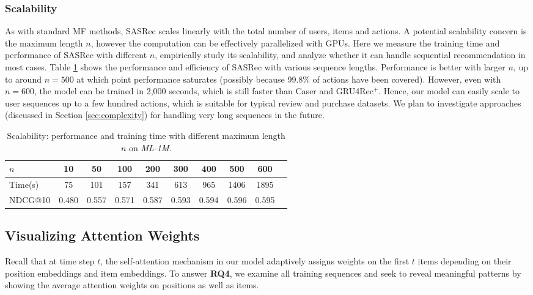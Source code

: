 \documentclass[conference]{IEEEtran}
\newcommand{\xhdr}[1]{\subsubsection*{\bf #1}}
\begin{document}
\xhdr{Scalability} As with standard MF methods, SASRec scales linearly with the total number of users, items and actions. A potential scalability concern is 
the maximum length $n$, however
the computation can be effectively parallelized
with GPUs. 
Here
we measure the training time and performance of SASRec with different $n$, empirically study its scalability, and analyze whether it can 
handle sequential recommendation in most cases. Table \ref{tab:scale} shows the performance and efficiency of SASRec with various sequence lengths. 
Performance is
better with larger $n$,
up to around $n=500$ at which point
performance saturates (possibly because 99.8\% of actions have been covered). However, even with $n=600$, the model can be trained in 2,000 seconds, which is still faster than Caser and GRU4Rec$^{\text{+}}$. Hence, our model can easily scale to user sequences 
up to a few hundred actions, which is suitable for typical review and purchase datasets.
We plan to investigate approaches (discussed in Section \ref{sec:complexity}) for handling very long sequences
in the future.



\begin{table}[h]
\centering
\caption{Scalability: performance and training time with different maximum length $n$ on \emph{ML-1M}.}
\setlength{\tabcolsep}{3pt}
\begin{tabular}{lccccccccc}
\toprule
$n$							&	10	&	50	&	100	&	200	&	300	&	400	&	500	&	600\\ \midrule                               
Time(s)  					&	75 	&	101 	&	157 	&	341 	&	613 	&	965 	&	1406 	&	1895 	&	\\
NDCG@10 					&	0.480 	&	0.557 	&	0.571 	&	0.587 	&	0.593 	&	0.594 	&	0.596 	&	0.595  \\                      
\bottomrule
\end{tabular}
\label{tab:scale}
\end{table}





\subsection{Visualizing Attention Weights}
\label{sec:vis}

Recall that at time step $t$, the self-attention mechanism in our model adaptively assigns weights on the first $t$ items depending on their position embeddings and item embeddings. To answer 
\textbf{RQ4}, we examine all 
training sequences and seek to reveal meaningful patterns by showing the average attention weights on positions as well as items.
\end{document}
